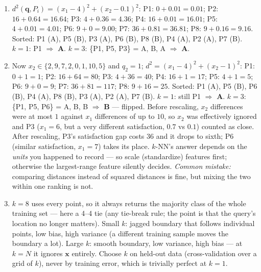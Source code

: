 \documentclass[
  11pt,
]{article}
\begin{document}
\begin{solutionbox}

\begin{enumerate}
\def\labelenumi{(\alph{enumi})}
\item
  \(d^2(\mathbf{q}, P_i) = (x_1-4)^2 + (x_2-0.1)^2\): P1:
  \(0 + 0.01 = 0.01\); P2: \(16 + 0.64 = 16.64\); P3:
  \(4 + 0.36 = 4.36\); P4: \(16 + 0.01 = 16.01\); P5:
  \(4 + 0.01 = 4.01\); P6: \(9 + 0 = 9.00\); P7: \(36 + 0.81 = 36.81\);
  P8: \(9 + 0.16 = 9.16\). Sorted: P1 (A), P5 (B), P3 (A), P6 (B), P8
  (B), P4 (A), P2 (A), P7 (B). \(k = 1\): P1 \(\Rightarrow\) \textbf{A}.
  \(k = 3\): \{P1, P5, P3\} = A, B, A \(\Rightarrow\) \textbf{A}.
\item
  Now \(x_2 \in \{2, 9, 7, 2, 0, 1, 10, 5\}\) and \(q_2 = 1\);
  \(d^2 = (x_1-4)^2 + (x_2-1)^2\): P1: \(0 + 1 = 1\); P2:
  \(16 + 64 = 80\); P3: \(4 + 36 = 40\); P4: \(16 + 1 = 17\); P5:
  \(4 + 1 = 5\); P6: \(9 + 0 = 9\); P7: \(36 + 81 = 117\); P8:
  \(9 + 16 = 25\). Sorted: P1 (A), P5 (B), P6 (B), P4 (A), P8 (B), P3
  (A), P2 (A), P7 (B). \(k = 1\): still P1 \(\Rightarrow\) \textbf{A}.
  \(k = 3\): \{P1, P5, P6\} = A, B, B \(\Rightarrow\) \textbf{B} ---
  flipped. Before rescaling, \(x_2\) differences were at most \(1\)
  against \(x_1\) differences of up to \(10\), so \(x_2\) was
  effectively ignored and P3 (\(x_1 = 6\), but a very different
  satisfaction, \(0.7\) vs \(0.1\)) counted as close. After rescaling,
  P3's satisfaction gap costs \(36\) and it drops to sixth; P6 (similar
  satisfaction, \(x_1 = 7\)) takes its place. \(k\)-NN's answer depends
  on the \emph{units} you happened to record --- so scale (standardize)
  features first; otherwise the largest-range feature silently decides.
  \emph{Common mistake:} comparing distances instead of squared
  distances is fine, but mixing the two within one ranking is not.
\item
  \(k = 8\) uses every point, so it always returns the majority class of
  the whole training set --- here a 4--4 tie (any tie-break rule; the
  point is that the query's location no longer matters). Small \(k\):
  jagged boundary that follows individual points, low bias, high
  variance (a different training sample moves the boundary a lot). Large
  \(k\): smooth boundary, low variance, high bias --- at \(k = N\) it
  ignores \(\mathbf{x}\) entirely. Choose \(k\) on held-out data
  (cross-validation over a grid of \(k\)), never by training error,
  which is trivially perfect at \(k = 1\).
\end{enumerate}

\end{solutionbox}
\end{document}
